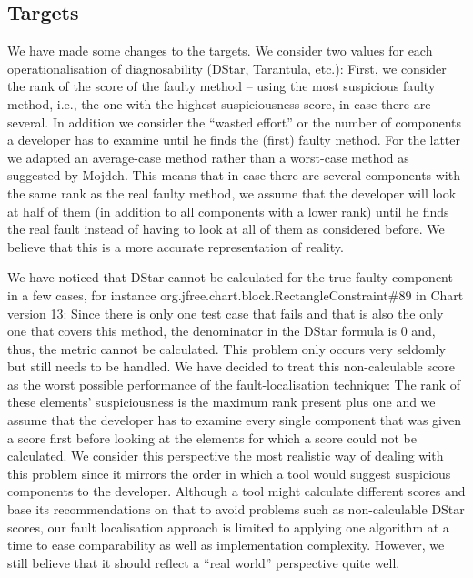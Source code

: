 \documentclass{scrartcl}
\begin{document}
\subsection{Targets}

We have made some changes to the targets. We consider two values for each
operationalisation of diagnosability (DStar, Tarantula, etc.): First, we
consider the rank of the score of the faulty method -- using the most suspicious
faulty method, i.e., the one with the highest suspiciousness score, in case
there are several. In addition we consider the \enquote{wasted effort} or the
number of components a developer has to examine until he finds the (first)
faulty method. For the latter we adapted an average-case method rather than a
worst-case method as suggested by Mojdeh. This means that in case there are
several components with the same rank as the real faulty method, we assume that
the developer will look at half of them (in addition to all components with a
lower rank) until he finds the real fault instead of having to look at all of
them as considered before. We believe that this is a more accurate
representation of reality.

We have noticed that DStar cannot be calculated for the true faulty component in
a few cases, for instance org.jfree.chart.block.RectangleConstraint\#89 in Chart
version 13: Since there is only one test case that fails and that is also the
only one that covers this method, the denominator in the DStar formula is 0 and,
thus, the metric cannot be calculated. This problem only occurs very seldomly
but still needs to be handled. We have decided to treat this non-calculable
score as the worst possible performance of the fault-localisation technique: The
rank of these elements' suspiciousness is the maximum rank present plus one and
we assume that the developer has to examine every single component that was
given a score first before looking at the elements for which a score could not
be calculated. We consider this perspective the most realistic way of dealing
with this problem since it mirrors the order in which a tool would suggest
suspicious components to the developer. Although a tool might calculate
different scores and base its recommendations on that to avoid problems such as
non-calculable DStar scores, our fault localisation approach is limited to
applying one algorithm at a time to ease comparability as well as implementation
complexity. However, we still believe that it should reflect a \enquote{real
world} perspective quite well.
\end{document}
